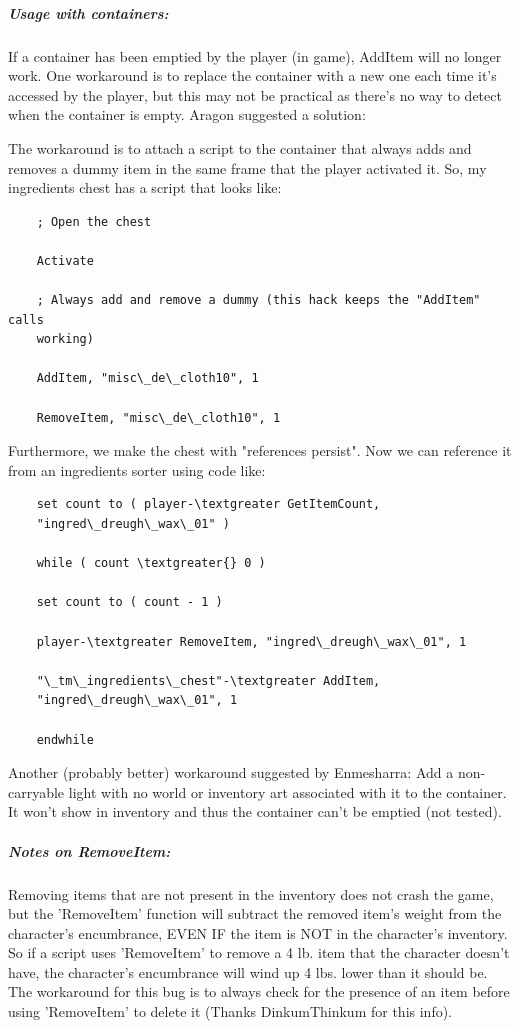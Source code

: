 \hypertarget{usage-with-containers}{%
\subparagraph{Usage with containers:}\label{usage-with-containers}}

If a container has been emptied by the player (in game), AddItem will no
longer work. One workaround is to replace the container with a new one
each time it's accessed by the player, but this may not be practical as
there's no way to detect when the container is empty. Aragon suggested a
solution:

The workaround is to attach a script to the container that always adds
and removes a dummy item in the same frame that the player activated it.
So, my ingredients chest has a script that looks like:

\begin{lstlisting}
	; Open the chest
	
	Activate
	
	; Always add and remove a dummy (this hack keeps the "AddItem" calls
	working)
	
	AddItem, "misc\_de\_cloth10", 1
	
	RemoveItem, "misc\_de\_cloth10", 1
\end{lstlisting}

Furthermore, we make the chest with "references persist". Now we can
reference it from an ingredients sorter using code like:

\begin{lstlisting}
	set count to ( player-\textgreater GetItemCount,
	"ingred\_dreugh\_wax\_01" )
	
	while ( count \textgreater{} 0 )
	
	set count to ( count - 1 )
	
	player-\textgreater RemoveItem, "ingred\_dreugh\_wax\_01", 1
	
	"\_tm\_ingredients\_chest"-\textgreater AddItem,
	"ingred\_dreugh\_wax\_01", 1
	
	endwhile
\end{lstlisting}

Another (probably better) workaround suggested by Enmesharra: Add a
non-carryable light with no world or inventory art associated with it to
the container. It won't show in inventory and thus the container can't
be emptied (not tested).

\hypertarget{notes-on-removeitem}{%
\subparagraph{Notes on RemoveItem:}\label{notes-on-removeitem}}

Removing items that are not present in the inventory does not crash the
game, but the 'RemoveItem' function will subtract the removed item's
weight from the character's encumbrance, EVEN IF the item is NOT in the
character's inventory. So if a script uses 'RemoveItem' to remove a 4
lb. item that the character doesn't have, the character's encumbrance
will wind up 4 lbs. lower than it should be. The workaround for this bug
is to always check for the presence of an item before using 'RemoveItem'
to delete it (Thanks DinkumThinkum for this info).


